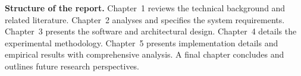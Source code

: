 \vspace{0.5cm}

\noindent
\textbf{Structure of the report.}
Chapter~1 reviews the technical background and related literature.
Chapter~2 analyses and specifies the system requirements.
Chapter~3 presents the software and architectural design.
Chapter~4 details the experimental methodology.
Chapter~5 presents implementation details and empirical results with
comprehensive analysis. A final chapter concludes and outlines future
research perspectives.
